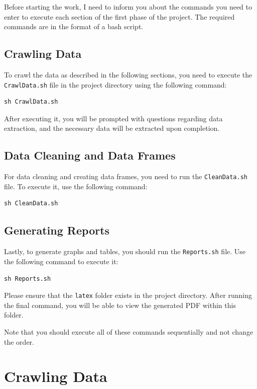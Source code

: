 \documentclass[a4paper]{article}
\begin{document}
Before starting the work, I need to inform you about the commands you need to enter to execute each section of the first phase of the project. The required commands are in the format of a bash script.

\subsection*{Crawling Data}

To crawl the data as described in the following sections, you need to execute the \texttt{CrawlData.sh} file in the project directory using the following command:

\begin{verbatim}
sh CrawlData.sh
\end{verbatim}

After executing it, you will be prompted with questions regarding data extraction, and the necessary data will be extracted upon completion.

\subsection*{Data Cleaning and Data Frames}

For data cleaning and creating data frames, you need to run the \texttt{CleanData.sh} file. To execute it, use the following command:

\begin{verbatim}
sh CleanData.sh
\end{verbatim}

\subsection*{Generating Reports}

Lastly, to generate graphs and tables, you should run the \texttt{Reports.sh} file. Use the following command to execute it:

\begin{verbatim}
sh Reports.sh
\end{verbatim}

Please ensure that the \texttt{latex} folder exists in the project directory. After running the final command, you will be able to view the generated PDF within this folder.

Note that you should execute all of these commands sequentially and not change the order.



\section{Crawling Data}
\end{document}
